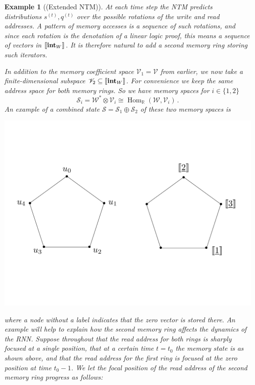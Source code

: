 \documentclass[english,letter paper,12pt,leqno]{article}
\theoremstyle{example}
\newtheorem{example}[theorem]{Example}
\numberwithin{equation}{section}
\def\Hom{\operatorname{Hom}}
\begin{document}
\begin{example}[(Extended NTM)]\label{example:ntm_extended} At each time step the NTM predicts distributions $s^{(t)}, q^{(t)}$ over the possible rotations of the write and read addresses. A pattern of memory accesses is a \emph{sequence} of such rotations, and since each rotation is the denotation of a linear logic proof, this means a sequence of vectors in $\llbracket \textbf{int}_W \rrbracket$. It is therefore natural to add a second memory ring storing such iterators.

In addition to the memory coefficient space $\mathscr{V}_1 = \mathscr{V}$ from earlier, we now take a finite-dimensional subspace $\mathscr{V}_2 \subseteq \llbracket \textbf{int}_W \rrbracket$. For convenience we keep the same address space for both memory rings. So we have memory spaces for $i \in \{1,2\}$
\[
\mathscr{S}_i = \mathscr{W}^* \otimes \mathscr{V}_i \cong \Hom_{\mathbb{R}}(\mathscr{W}, \mathscr{V}_i)\,.
\]
An example of a combined state $\mathscr{S} = \mathscr{S}_1 \oplus \mathscr{S}_2$ of these two memory spaces is
\begin{center}
\includegraphics[scale=0.3]{dia2}
\end{center}
where a node without a label indicates that the zero vector is stored there. An example will help to explain how the second memory ring affects the dynamics of the RNN. Suppose throughout that the read address for both rings is sharply focused at a single position, that at a certain time $t = t_0$ the memory state is as shown above, and that the read address for the first ring is focused at the zero position at time $t_0 - 1$. We let the focal position of the read address of the second memory ring progress as follows:

\end{example}
\end{document}
